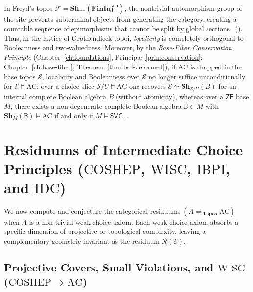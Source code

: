 \documentclass[10pt,twoside,openright]{book}
\theoremstyle{crmplain}
\theoremstyle{crmdef}
\theoremstyle{crmremark}
\begin{document}
In Freyd's topos $\mathcal{F} = \mathbf{Sh}_{\neg\neg}(\mathbf{FinInj}^{\mathrm{op}})$, the nontrivial automorphism group of the site prevents subterminal objects from generating the category, creating a countable sequence of epimorphisms that cannot be split by global sections~\cite{Freyd72} (\cite[\S D4.5]{Johnstone02}). Thus, in the lattice of Grothendieck topoi, \emph{localicity} is completely orthogonal to Booleanness and two-valuedness. Moreover, by the \emph{Base-Fiber Conservation Principle} (Chapter~\ref{ch:foundations}, Principle~\ref{prin:conservation}; Chapter~\ref{ch:base-fiber}, Theorem~\ref{thm:bdf-deformed}), if $\mathrm{AC}$ is dropped in the base topos $\mathcal{S}$, localicity and Booleanness over $\mathcal{S}$ no longer suffice unconditionally for $\mathcal{E} \models \mathrm{AC}$: over a choice slice $\mathcal{S}/U \models \mathrm{AC}$ one recovers $\mathcal{E} \simeq \mathbf{Sh}_{\mathcal{S}/U}(B)$ for an internal complete Boolean algebra $B$ (without atomicity), whereas over a $\mathsf{ZF}$ base $M$, there exists a non-degenerate complete Boolean algebra $\mathbb{B} \in M$ with $\mathbf{Sh}_M(\mathbb{B}) \models \mathrm{AC}$ if and only if $M \models \mathsf{SVC}$~\cite{Blass79,Usuba21}.

\section{\texorpdfstring{Residuums of Intermediate Choice Principles ($\mathrm{COSHEP}$, $\mathrm{WISC}$, $\mathrm{IBPI}$, and $\mathrm{IDC}$)}{Residuums of Intermediate Choice Principles (COSHEP, WISC, IBPI, and IDC)}}

We now compute and conjecture the categorical residuums $(A \Rightarrow_{\mathbf{Topos}} \mathrm{AC})$ when $A$ is a non-trivial weak choice axiom. Each weak choice axiom absorbs a specific dimension of projective or topological complexity, leaving a complementary geometric invariant as the residuum $\mathcal{R}(\mathcal{E})$.

\subsection{\texorpdfstring{Projective Covers, Small Violations, and $\mathrm{WISC}$ ($\mathrm{COSHEP} \Rightarrow \mathrm{AC}$)}{Projective Covers, Small Violations, and WISC (COSHEP => AC)}}
\end{document}
